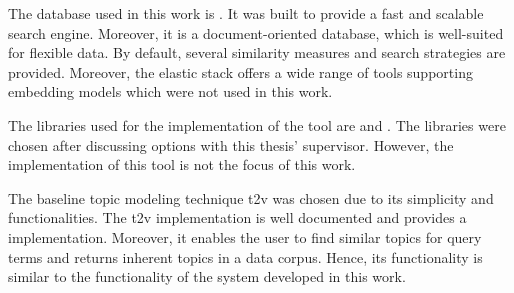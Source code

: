 The database used in this work is \databaseName{}.
It was built to provide a fast and scalable search engine.
Moreover, it is a document-oriented database, which is well-suited for flexible data.
By default, several similarity measures and search strategies are provided.
Moreover, the elastic stack offers a wide range of tools supporting embedding models which were not used in this work.


The libraries used for the implementation of the tool are \angular{} and \flask{}.
The libraries were chosen after discussing options with this thesis' supervisor.
However, the implementation of this tool is not the focus of this work.

The baseline topic modeling technique \ac{t2v} was chosen due to its simplicity and functionalities.
The \ac{t2v} implementation is well documented and provides a \wordcloud{} implementation.
Moreover, it enables the user to find similar topics for query terms and returns inherent topics in a data corpus.
Hence, its functionality is similar to the functionality of the system developed in this work.